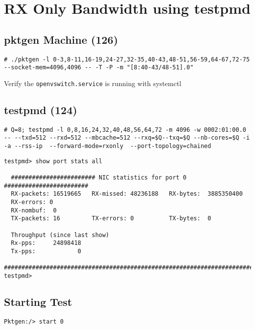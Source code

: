 \documentclass[letter]{article}
\begin{document}
\section{RX Only Bandwidth using testpmd}
{\setlength{\parindent}{0cm}

\subsection{pktgen Machine (126)}

\begin{lstlisting}
# ./pktgen -l 0-3,8-11,16-19,24-27,32-35,40-43,48-51,56-59,64-67,72-75 --socket-mem=4096,4096 -- -T -P -m "[8:40-43/48-51].0"
\end{lstlisting}

Verify the \texttt{openvswitch.service} is running with systemctl

\subsection{testpmd (124)}

\begin{lstlisting}[escapechar=!]
# Q=8; testpmd -l 0,8,16,24,32,40,48,56,64,72 -m 4096 -w 0002:01:00.0 -- --txd=512 --rxd=512 --mbcache=512 --rxq=$Q--txq=$Q --nb-cores=$Q -i -a --rss-ip  --forward-mode=rxonly  --port-topology=chained
\end{lstlisting}

\begin{lstlisting}
testpmd> show port stats all

  ######################## NIC statistics for port 0  ########################
  RX-packets: 16519665   RX-missed: 48236188   RX-bytes:  3885350400
  RX-errors: 0
  RX-nombuf:  0         
  TX-packets: 16         TX-errors: 0          TX-bytes:  0

  Throughput (since last show)
  Rx-pps:     24898418
  Tx-pps:            0
  ############################################################################
testpmd> 
\end{lstlisting}

\subsection{Starting Test}

\begin{lstlisting}[escapechar=!]
Pktgen:/> start 0
\end{lstlisting}

}
\end{document}
